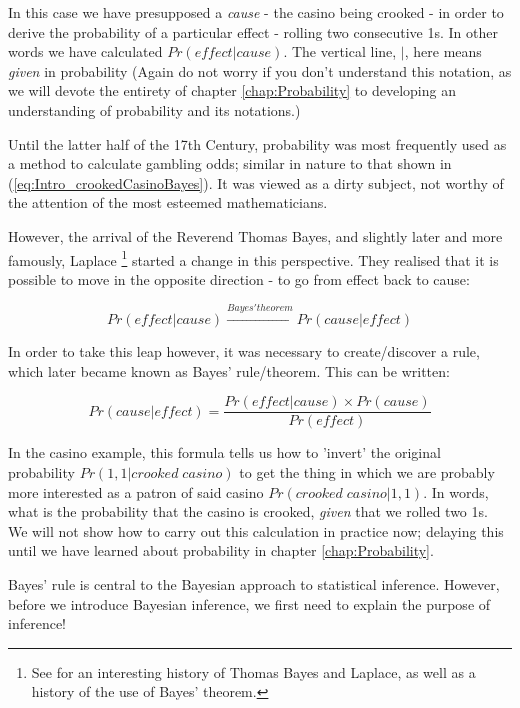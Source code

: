 \documentclass[11pt,fullpage]{book}
\begin{document}
In this case we have presupposed a \textit{cause} - the casino being crooked - in order to derive the probability of a particular effect - rolling two consecutive 1s. In other words we have calculated $Pr(effect|cause)$. The vertical line, $|$, here means \textit{given} in probability (Again do not worry if you don't understand this notation, as we will devote the entirety of chapter \ref{chap:Probability} to developing an understanding of probability and its notations.) 

Until the latter half of the 17th Century, probability was most frequently used as a method to calculate gambling odds; similar in nature to that shown in (\ref{eq:Intro_crookedCasinoBayes}). It was viewed as a dirty subject, not worthy of the attention of the most esteemed mathematicians.

However, the arrival of the Reverend Thomas Bayes, and slightly later and more famously, Laplace \footnote{See \cite{mcgrayne2011theory} for an interesting history of Thomas Bayes and Laplace, as well as a history of the use of Bayes' theorem.} started a change in this perspective. They realised that it is possible to move in the opposite direction - to go from effect back to cause:

\begin{equation}
Pr(effect|cause) \xrightarrow{Bayes' theorem} Pr(cause|effect)
\end{equation}

In order to take this leap however, it was necessary to create/discover a rule, which later became known as Bayes' rule/theorem. This can be written:

\begin{equation}\label{eq:Intro_BayesRuleCauseEffect}
Pr(cause|effect) = \frac{Pr(effect|cause)\times Pr(cause)}{Pr(effect)}
\end{equation}

In the casino example, this formula tells us how to 'invert' the original probability $Pr(1,1|crooked\;casino)$ to get the thing in which we are probably more interested as a patron of said casino $Pr(crooked\;casino|1,1)$. In words, what is the probability that the casino is crooked, \textit{given} that we rolled two 1s. We will not show how to carry out this calculation in practice now; delaying this until we have learned about probability in chapter \ref{chap:Probability}.

Bayes' rule is central to the Bayesian approach to statistical inference. However, before we introduce Bayesian inference, we first need to explain the purpose of inference!
\end{document}
